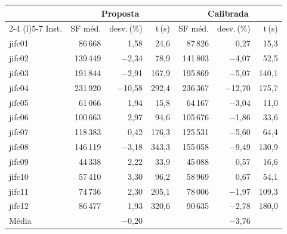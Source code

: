 \begin{tabular}{lrrrrrr}
\toprule
& \multicolumn{3}{c}{Proposta} & \multicolumn{3}{c}{Calibrada} \\ \cmidrule(lr){2-4} \cmidrule(l){5-7}
Inst. & SF méd. & desv.\,(\%) & t\,(s) & SF méd. & desv.\,(\%) & t\,(s) \\ \midrule
jifc01 & 86\,668 & 1{,}58 & 24{,}6 & 87\,826 & 0{,}27 & 15{,}3 \\
jifc02 & 139\,449 & $-$2{,}34 & 78{,}9 & 141\,803 & $-$4{,}07 & 52{,}5 \\
jifc03 & 191\,844 & $-$2{,}91 & 167{,}9 & 195\,869 & $-$5{,}07 & 140{,}1 \\
jifc04 & 231\,920 & $-$10{,}58 & 292{,}4 & 236\,367 & $-$12{,}70 & 175{,}7 \\
jifc05 & 61\,066 & 1{,}94 & 15{,}8 & 64\,167 & $-$3{,}04 & 11{,}0 \\
jifc06 & 100\,663 & 2{,}97 & 94{,}6 & 105\,676 & $-$1{,}86 & 33{,}6 \\
jifc07 & 118\,383 & 0{,}42 & 176{,}3 & 125\,531 & $-$5{,}60 & 64{,}4 \\
jifc08 & 146\,119 & $-$3{,}18 & 343{,}3 & 155\,058 & $-$9{,}49 & 130{,}9 \\
jifc09 & 44\,338 & 2{,}22 & 33{,}9 & 45\,088 & 0{,}57 & 16{,}6 \\
jifc10 & 57\,410 & 3{,}30 & 96{,}2 & 58\,969 & 0{,}67 & 54{,}1 \\
jifc11 & 74\,736 & 2{,}30 & 205{,}1 & 78\,006 & $-$1{,}97 & 109{,}3 \\
jifc12 & 86\,477 & 1{,}93 & 320{,}6 & 90\,635 & $-$2{,}78 & 180{,}0 \\
\midrule
Média & & $-$0{,}20 & & & $-$3{,}76 & \\
\bottomrule
\end{tabular}

